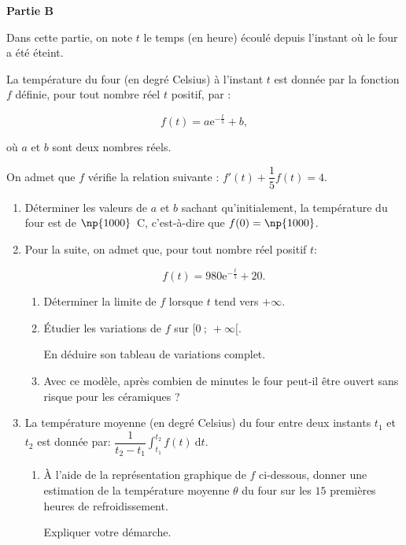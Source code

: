 \documentclass{cornouaille}
\begin{document}
\begin{exercice}
\bigskip

\textbf{Partie B}

\medskip

Dans cette partie, on note $t$ le temps (en heure) écoulé depuis l'instant où le four a été éteint.

La température du four (en degré Celsius) à l'instant $t$ est donnée par la fonction $f$ définie,
pour tout nombre réel $t$ positif, par : 

\[f(t) = a\text{e}^{- \frac{t}{5}} + b,\]

où $a$ et $b$ sont deux nombres réels.

On admet que $f$ vérifie la relation suivante : $f'(t) + \dfrac{1}{5}f(t) = 4$.
\medskip

\begin{enumerate}
\item Déterminer les valeurs de $a$ et $b$ sachant qu'initialement, la température du four est de
$\np{1000}$~\degres C, c'est-à-dire que $f(0) = \np{1000}$.
\item  Pour la suite, on admet que, pour tout nombre réel positif $t$: 

\[f(t) = 980\text{e}^{- \frac{t}{5}} + 20.\]

\medskip

	\begin{enumerate}
		\item Déterminer la limite de $f$ lorsque $t$ tend vers $+ \infty$.
		\item Étudier les variations de $f$ sur $[0~;~+ \infty[$. 
		
En déduire son tableau de variations complet.
		\item Avec ce modèle, après combien de minutes le four peut-il être ouvert sans risque pour
 les céramiques ?
 	\end{enumerate}
\item  La température moyenne (en degré Celsius) du four entre deux instants $t_1$ et $t_2$ est donnée
par: $\dfrac{1}{t_2 - t_1}\displaystyle\int_{t_1}^{t_2} f(t)\:\text{d}t$.

	\begin{enumerate}
		\item À l'aide de la représentation graphique de $f$ ci-dessous, donner une estimation de la
température moyenne $\theta$ du four sur les $15$ premières heures de refroidissement.
		
Expliquer votre démarche.
		

\end{enumerate}
\end{enumerate}
\end{exercice}
\end{document}
